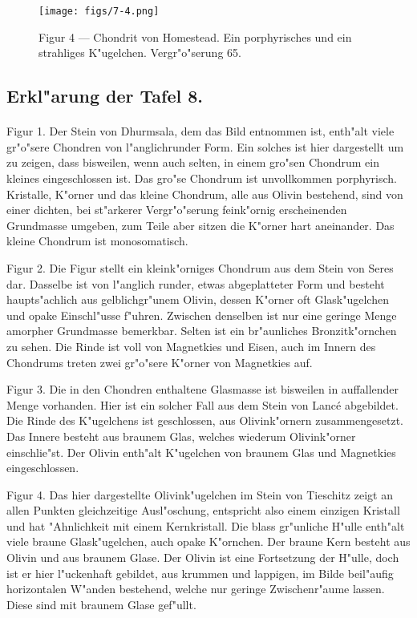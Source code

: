 \documentclass[a4paper, 11pt, oneside, polutonikogreek, german]{article}
\begin{document}
\vspace*{\fill}
\begin{figure}[H]
\centering
\texttt{[image: figs/7-4.png]}
\caption{\small Figur 4 --- Chondrit von Homestead. Ein porphyrisches und ein strahliges K"ugelchen. Vergr"o"serung 65.}
\end{figure}
\vspace*{\fill}
\clearpage

\subsection{Erkl"arung der Tafel 8.}
\paragraph{}
Figur 1. Der Stein von Dhurmsala, dem das Bild entnommen ist, enth"alt viele gr"o"sere Chondren von l"anglichrunder Form. Ein solches ist hier dargestellt um zu zeigen, dass bisweilen, wenn auch selten, in einem gro"sen Chondrum ein kleines eingeschlossen ist. Das gro"se Chondrum ist unvollkommen porphyrisch. Kristalle, K"orner und das kleine Chondrum, alle aus Olivin bestehend, sind von einer dichten, bei st"arkerer Vergr"o"serung feink"ornig erscheinenden Grundmasse umgeben, zum Teile aber sitzen die K"orner hart aneinander. Das kleine Chondrum ist monosomatisch.

Figur 2. Die Figur stellt ein kleink"orniges Chondrum aus dem Stein von Seres dar. Dasselbe ist von l"anglich runder, etwas abgeplatteter Form und besteht haupts"achlich aus gelblichgr"unem Olivin, dessen K"orner oft Glask"ugelchen und opake Einschl"usse f"uhren. Zwischen denselben ist nur eine geringe Menge amorpher Grundmasse bemerkbar. Selten ist ein br"aunliches Bronzitk"ornchen zu sehen. Die Rinde ist voll von Magnetkies und Eisen, auch im Innern des Chondrums treten zwei gr"o"sere K"orner von Magnetkies auf.

Figur 3. Die in den Chondren enthaltene Glasmasse ist bisweilen in auffallender Menge vorhanden. Hier ist ein solcher Fall aus dem Stein von Lancé abgebildet. Die Rinde des K"ugelchens ist geschlossen, aus Olivink"ornern zusammengesetzt. Das Innere besteht aus braunem Glas, welches wiederum Olivink"orner einschlie"st. Der Olivin enth"alt K"ugelchen von braunem Glas und Magnetkies eingeschlossen.

Figur 4. Das hier dargestellte Olivink"ugelchen im Stein von Tieschitz zeigt an allen Punkten gleichzeitige Ausl"oschung, entspricht also einem einzigen Kristall und hat "Ahnlichkeit mit einem Kernkristall. Die blass gr"unliche H"ulle enth"alt viele braune Glask"ugelchen, auch opake K"ornchen. Der braune Kern besteht aus Olivin und aus braunem Glase. Der Olivin ist eine Fortsetzung der H"ulle, doch ist er hier l"uckenhaft gebildet, aus krummen und lappigen, im Bilde beil"aufig horizontalen W"anden bestehend, welche nur geringe Zwischenr"aume lassen. Diese sind mit braunem Glase gef"ullt.
\clearpage
\end{document}
